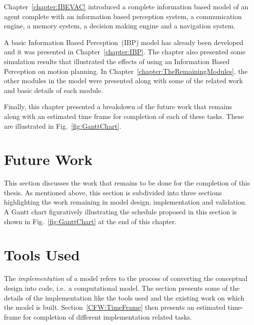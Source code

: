 Chapter~\ref{chapter:IBEVAC} introduced a complete information based model of an agent complete with an information based perception system, a communication engine, a memory system, a decision making engine and a navigation system.

A basic Information Based Perception~(IBP) model has already been developed and it was presented in Chapter~\ref{chapter:IBP}. The chapter also presented some simulation results that illustrated the effects of using an Information Based Perception on motion planning. In Chapter~\ref{chapter:TheRemainingModules}, the other modules in the model were presented along with some of the related work and basic details of each module.

Finally, this chapter presented a breakdown of the future work that remains along with an estimated time frame for completion of each of these tasks. These are illustrated in Fig.~\ref{fig:GanttChart}.


\section{Future Work}
\label{CFW:FutureWork}
This section discusses the work that remains to be done for the completion of this thesis. As mentioned above, this section is subdivided into three sections highlighting the work remaining in model design, implementation and validation. A Gantt chart figuratively illustrating the schedule proposed in this section is shown in Fig.~\ref{fig:GanttChart} at the end of this chapter.


\section{Tools Used}
\label{CFW:Implementation}

The \emph{implementation} of a model refers to the process of converting the conceptual design into code, i.e.\ a computational model. The section presents some of the details of the implementation like the tools used and the existing work on which the model is built. Section~\ref{CFW:TimeFrame} then presents an estimated time-frame for completion of different implementation related tasks.


